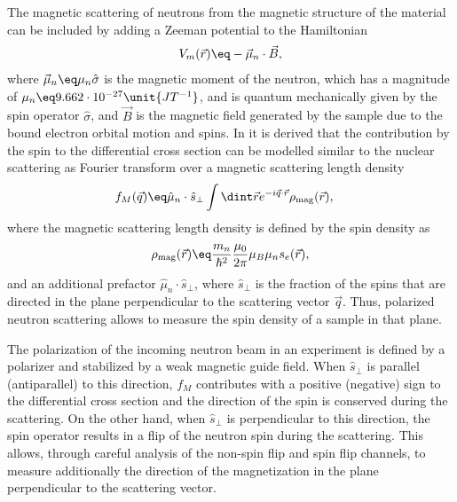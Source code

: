 \documentclass[\main/dresen_thesis.tex]{subfiles}
\begin{document}
The magnetic scattering of neutrons from the magnetic structure of the material can be included by adding a Zeeman potential to the Hamiltonian
\begin{align}
  V_m (\vec{r}) \eq - \vec{\mu}_n \cdot \vec{B},
\end{align}
where $\vec{\mu}_n \eq \mu_n \hat{\sigma}$ is the magnetic moment of the neutron, which has a magnitude of $\mu_n \eq 9.662 \cdot 10^{-27} \unit{JT^{-1}}$, and is quantum mechanically given by the spin operator $\hat{\sigma}$, and $\vec{B}$ is the magnetic field generated by the sample due to the bound electron orbital motion and spins.
In  it is derived that the contribution by the spin to the differential cross section can be modelled similar to the nuclear scattering as Fourier transform over a magnetic scattering length density
\begin{align}
  f_M (\vec{q}) \eq & \hat{\mu}_n \cdot \hat{s}_\perp \int \dint \vec{r} e^{- i \vec{q} \cdot \vec{r}} \rho_\mathrm{mag}(\vec{r}),
\end{align}
where the magnetic scattering length density is defined by the spin density as
\begin{align}
  \rho_\mathrm{mag} (\vec{r}) \eq \frac{m_n}{\hbar^2}  \frac{\mu_0}{2\pi} \mu_B \mu_n s_e (\vec{r}),
  \label{eq:theoreticalBackground:scattering:magneticSLD}
\end{align}
and an additional prefactor $\hat{\mu}_n \cdot \hat{s}_\perp$, where $\hat{s}_\perp$ is the fraction of the spins that are directed in the plane perpendicular to the scattering vector $\vec{q}$.
Thus, polarized neutron scattering allows to measure the spin density of a sample in that plane.

The polarization of the incoming neutron beam in an experiment is defined by a polarizer and stabilized by a weak magnetic guide field.
When $\hat{s}_\perp$ is parallel (antiparallel) to this direction, $f_M$ contributes with a positive (negative) sign to the differential cross section and the direction of the spin is conserved during the scattering.
On the other hand, when $\hat{s}_\perp$ is perpendicular to this direction, the spin operator results in a flip of the neutron spin during the scattering.
This allows, through careful analysis of the non-spin flip and spin flip channels, to measure additionally the direction of the magnetization in the plane perpendicular to the scattering vector.
\end{document}
